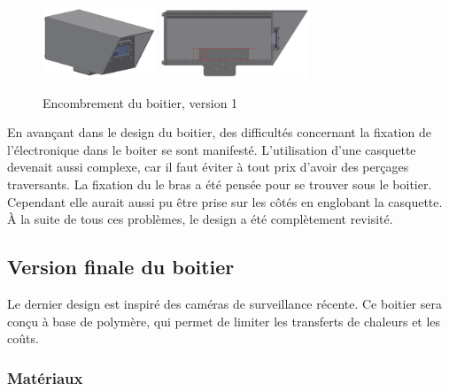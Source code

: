 \begin{figure}[H]
    \centering
    \includegraphics[width=0.3\textwidth]{Images/photos_PGA/boitierV3.PNG}
    \includegraphics[width=0.4\textwidth]{Images/photos_PGA/boitierV3enc.PNG}
    \caption{Encombrement du boitier, version 1}
    \label{fig:encombrementv1}
\end{figure}

En avançant dans le design du boitier, des difficultés concernant la fixation de l’électronique dans le boiter 
se sont manifesté. L’utilisation d’une casquette devenait aussi complexe, car il faut éviter à tout prix d'avoir
des perçages traversants. La fixation du le bras a été pensée pour se trouver
sous le boitier. Cependant elle aurait aussi pu être prise sur les côtés en englobant la casquette. 
À la suite de tous ces problèmes, le design a été complètement revisité.

\subsection{Version finale du boitier}

Le dernier design est inspiré des caméras de surveillance récente. Ce boitier sera conçu à base de 
polymère, qui permet de limiter les transferts de chaleurs et les coûts.

\subsubsection{Matériaux}

